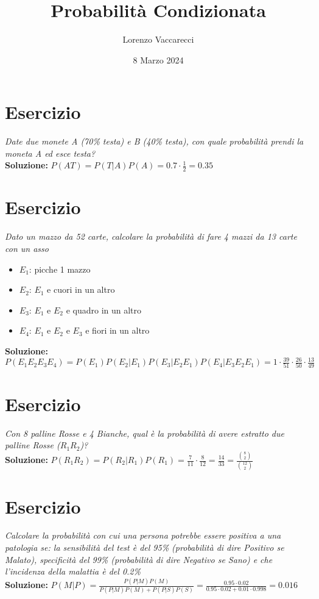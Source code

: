 \documentclass[12pt]{article}
\title{Probabilità Condizionata}
\author{Lorenzo Vaccarecci}
\date{8 Marzo 2024}
\begin{document}
\maketitle
\section{Esercizio}
\textit{Date due monete A (70\% testa) e B (40\% testa), con quale probabilità prendi la moneta A ed esce testa?}\\
\textbf{Soluzione: }\(P(AT)=P(T|A)P(A)=0.7\cdot\frac{1}{2}=0.35\)
\section{Esercizio}
\textit{Dato un mazzo da 52 carte, calcolare la probabilità di fare 4 mazzi da 13 carte con un asso}
\begin{itemize}
    \item $E_{1}$: picche 1 mazzo
    \item $E_{2}$: $E_{1}$ e cuori in un altro
    \item $E_{3}$: $E_{1}$ e $E_{2}$ e quadro in un altro
    \item $E_{4}$: $E_{1}$ e $E_{2}$ e $E_{3}$ e fiori in un altro
\end{itemize}
\textbf{Soluzione: }\(P(E_{1}E_{2}E_{3}E_{4})=P(E_{1})P(E_{2}|E_{1})P(E_{3}|E_{2}E_{1})P(E_{4}|E_{3}E_{2}E_{1}) = 1\cdot \frac{39}{51} \cdot \frac{26}{50} \cdot \frac{13}{49}\)
\section{Esercizio}
\textit{Con 8 palline Rosse e 4 Bianche, qual è la probabilità di avere estratto due palline Rosse ($R_{1}R_{2}$)?}\\
\textbf{Soluzione: }\(P(R_{1}R_{2})=P(R_{2}|R_{1})P(R_{1})=\frac{7}{11}\cdot \frac{8}{12}=\frac{14}{33}=\frac{\binom{8}{2}}{\binom{12}{2}}\)
\section{Esercizio}
\textit{Calcolare la probabilità con cui una persona potrebbe essere positiva a una patologia se: la sensibilità del test è del 95\% (probabilità di dire Positivo se Malato), specificità del 99\% (probabilità di dire Negativo se Sano) e che l'incidenza della malattia è del 0.2\%}\\
\textbf{Soluzione: }\(P(M|P)=\frac{P(P|M)P(M)}{P(P|M)P(M)+P(P|S)P(S)}=\frac{0.95\cdot 0.02}{0.95\cdot 0.02 + 0.01\cdot 0.998}=0.016\)
\end{document}
